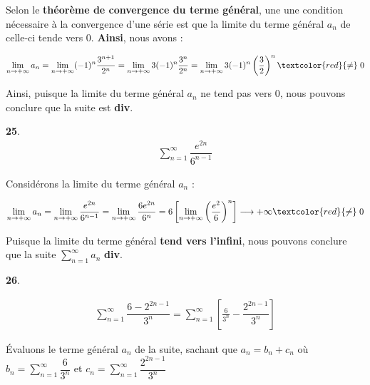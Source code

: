 \documentclass{report}
\begin{document}
    Selon le \textbf{théorème de convergence du terme général}, une 
    une condition nécessaire à la convergence d'une série est que 
    la limite du terme général $a_n$ de celle-ci tende vers $0$. 
    \textbf{Ainsi}, nous avons : 

    \begin{align*}
        \lim\limits_{n \to+\infty }a_n = 
        \lim\limits_{n\to+\infty } (-1)^n \dfrac{3^{n+1}}{2^n} = 
        \lim\limits_{n\to+\infty } 3(-1)^n \dfrac{3^n}{2^n} =
        \lim\limits_{n\to+\infty } 3(-1)^n \left(\dfrac{3}{2} \right)^n
        \textcolor{red}{\neq} \; 0  
    \end{align*}

    Ainsi, puisque la limite du terme général $a_n$ ne tend pas vers $0$, 
    nous pouvons conclure que la suite est \textcolor{myr}{\textbf{div}}. 


    \vspace{1em}

    \noindent\textbf{25}.  
    \begin{align*}
        \sum_{n=1}^{\infty }\dfrac{e^{2n}}{6^{n-1}}
    \end{align*}

    Considérons la limite du terme général $a_n$ :

    \begin{align*}
        \lim\limits_{n \to+\infty }a_n = 
        \lim\limits_{n \to+\infty } \dfrac{e^{2n}}{6^{n-1}} = 
        \lim\limits_{n \to+\infty } \dfrac{6e^{2n}}{6^{n}}  = 
        6 \left[\lim\limits_{n \to+\infty } 
        \left(\dfrac{e^{2}}{6}\right)^n \right]
        \longrightarrow + \infty \textcolor{red}{\neq} \; 0  
    \end{align*}

    Puisque la limite du terme général \textbf{tend vers l'infini}, 
    nous pouvons conclure que la suite 
    $\sum_{n=1}^{\infty }a_n$ \textcolor{myr}{\textbf{div}}.    



    \noindent\textbf{26}.  


    \begin{align*}
        \sum_{n=1}^{\infty }\dfrac{6 - 2^{2n -1}}{3^n} = 
        \sum_{n=1}^{\infty }
        \left[%
        \frac{6}{3^n}  
        - 
        \dfrac{2^{2n -1}}{3^n}
        \right]%
    \end{align*}

    Évaluons le terme général $a_n$ de la suite, sachant que 
    $a_n = b_n  + c_n$ où $b_n = \sum_{n=1}^{\infty }\dfrac{6}{3^n}$ 
    et $c_n = \sum_{n=1}^{\infty }\dfrac{2^{2n -1}}{3^n}$ 
\end{document}
